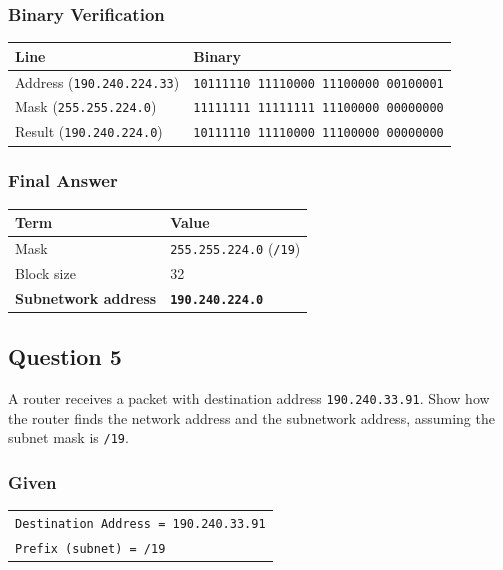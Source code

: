 \documentclass[11pt,a4paper]{article}
\begin{document}
\subsubsection*{Binary Verification}

\begin{tabularx}{\textwidth}{@{}lX@{}}
\toprule
\rowcolor{tablehead}\textbf{Line} & \textbf{Binary} \\
\midrule
Address (\texttt{190.240.224.33}) & \texttt{10111110 11110000 11100000 00100001} \\
Mask (\texttt{255.255.224.0}) & \texttt{11111111 11111111 11100000 00000000} \\
Result (\texttt{190.240.224.0}) & \texttt{10111110 11110000 11100000 00000000} \\
\bottomrule
\end{tabularx}

\subsubsection*{Final Answer}

\begin{tabularx}{\textwidth}{@{}lX@{}}
\toprule
\rowcolor{tablehead}\textbf{Term} & \textbf{Value} \\
\midrule
Mask & \texttt{255.255.224.0} (\texttt{/19}) \\
Block size & 32 \\
\textbf{Subnetwork address} & \textbf{\texttt{190.240.224.0}} \\
\bottomrule
\end{tabularx}

\subsection*{Question 5}

A router receives a packet with destination address \texttt{190.240.33.91}. Show how the
router finds the network address and the subnetwork address, assuming the subnet mask is
\texttt{/19}.

\subsubsection*{Given}

\begin{tabularx}{\textwidth}{@{}X@{}}
\texttt{Destination Address = 190.240.33.91} \\
\texttt{Prefix (subnet) = /19} \\
\end{tabularx}
\end{document}
